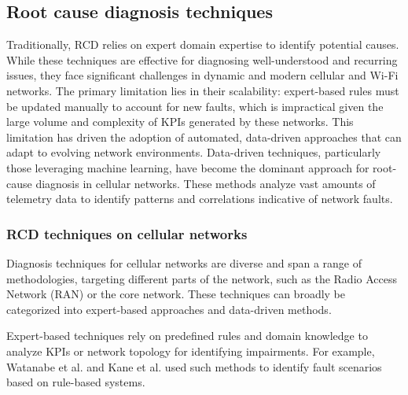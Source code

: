 \subsection{Root cause diagnosis techniques}

Traditionally, RCD relies on expert domain expertise to identify potential causes. While these techniques are effective for diagnosing well-understood and recurring issues, they face significant challenges in dynamic and modern cellular and Wi-Fi networks. The primary limitation lies in their scalability: expert-based rules must be updated manually to account for new faults, which is impractical given the large volume and complexity of KPIs generated by these networks. This limitation has driven the adoption of automated, data-driven approaches that can adapt to evolving network environments. Data-driven techniques, particularly those leveraging machine learning, have become the dominant approach for root-cause diagnosis in cellular networks. These methods analyze vast amounts of telemetry data to identify patterns and correlations indicative of network faults.

\subsubsection{RCD techniques on cellular networks}

Diagnosis techniques for cellular networks are diverse and span a range of methodologies, targeting different parts of the network, such as the Radio Access Network (RAN) or the core network. These techniques can broadly be categorized into expert-based approaches and data-driven methods.

Expert-based techniques rely on predefined rules and domain knowledge to analyze KPIs or network topology for identifying impairments. For example, Watanabe et al. \cite{watanabe2008utran} and Kane et al. \cite{kane2015system} used such methods to identify fault scenarios based on rule-based systems. 

